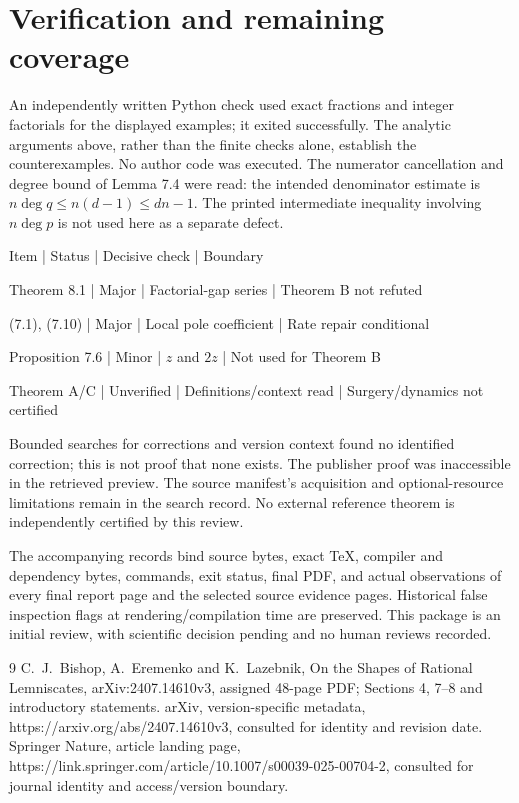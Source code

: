 \documentclass[10pt]{article}
\begin{document}
\section*{Verification and remaining coverage}
An independently written Python check used exact fractions and integer factorials for the displayed examples; it exited successfully. The analytic arguments above, rather than the finite checks alone, establish the counterexamples. No author code was executed. The numerator cancellation and degree bound of Lemma 7.4 were read: the intended denominator estimate is \(n\deg q\le n(d-1)\le dn-1\). The printed intermediate inequality involving \(n\deg p\) is not used here as a separate defect.\par
Item | Status | Decisive check | Boundary\par
Theorem 8.1 | Major | Factorial-gap series | Theorem B not refuted\par
(7.1), (7.10) | Major | Local pole coefficient | Rate repair conditional\par
Proposition 7.6 | Minor | \(z\) and \(2z\) | Not used for Theorem B\par
Theorem A/C | Unverified | Definitions/context read | Surgery/dynamics not certified\par
Bounded searches for corrections and version context found no identified correction; this is not proof that none exists. The publisher proof was inaccessible in the retrieved preview. The source manifest’s acquisition and optional-resource limitations remain in the search record. No external reference theorem is independently certified by this review.\par
The accompanying records bind source bytes, exact TeX, compiler and dependency bytes, commands, exit status, final PDF, and actual observations of every final report page and the selected source evidence pages. Historical false inspection flags at rendering/compilation time are preserved. This package is an initial review, with scientific decision pending and no human reviews recorded.\par
9 C. J. Bishop, A. Eremenko and K. Lazebnik, On the Shapes of Rational Lemniscates, arXiv:2407.14610v3, assigned 48-page PDF; Sections 4, 7–8 and introductory statements. arXiv, version-specific metadata, https://arxiv.org/abs/2407.14610v3, consulted for identity and revision date. Springer Nature, article landing page, https://link.springer.com/article/10.1007/s00039-025-00704-2, consulted for journal identity and access/version boundary.\par
\end{document}
